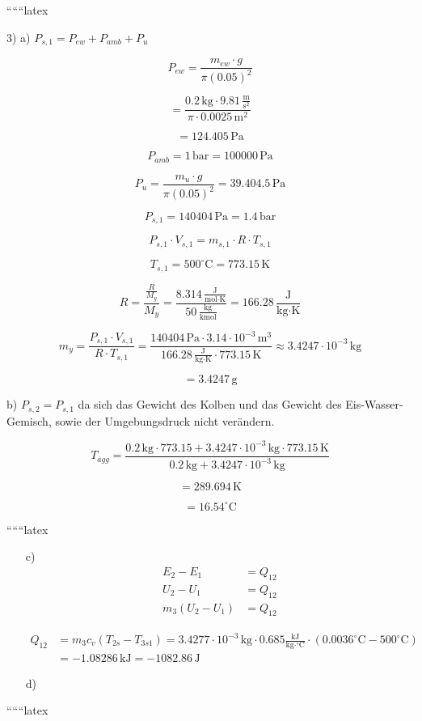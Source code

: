 
``````latex


3) a) \( P_{s,1} = P_{ew} + P_{amb} + P_u \)

\[
P_{ew} = \frac{m_{ew} \cdot g}{\pi (0.05)^2}
\]

\[
= \frac{0.2 \, \text{kg} \cdot 9.81 \, \frac{\text{m}}{\text{s}^2}}{\pi \cdot 0.0025 \, \text{m}^2}
\]

\[
= 124.405 \, \text{Pa}
\]

\[
P_{amb} = 1 \, \text{bar} = 100000 \, \text{Pa}
\]

\[
P_u = \frac{m_u \cdot g}{\pi (0.05)^2} = 39.404.5 \, \text{Pa}
\]

\[
P_{s,1} = 140404 \, \text{Pa} = 1.4 \, \text{bar}
\]

\[
P_{s,1} \cdot V_{s,1} = m_{s,1} \cdot R \cdot T_{s,1}
\]

\[
T_{s,1} = 500^\circ \text{C} = 773.15 \, \text{K}
\]

\[
R = \frac{\frac{R}{M_y}}{M_y} = \frac{8.314 \, \frac{\text{J}}{\text{mol} \cdot \text{K}}}{50 \, \frac{\text{kg}}{\text{kmol}}} = 166.28 \, \frac{\text{J}}{\text{kg} \cdot \text{K}}
\]

\[
m_y = \frac{P_{s,1} \cdot V_{s,1}}{R \cdot T_{s,1}} = \frac{140404 \, \text{Pa} \cdot 3.14 \cdot 10^{-3} \, \text{m}^3}{166.28 \, \frac{\text{J}}{\text{kg} \cdot \text{K}} \cdot 773.15 \, \text{K}} \approx 3.4247 \cdot 10^{-3} \, \text{kg}
\]

\[
= 3.4247 \, \text{g}
\]

b) \( P_{s,2} = P_{s,1} \) da sich das Gewicht des Kolben und das Gewicht des Eis-Wasser-Gemisch, sowie der Umgebungsdruck nicht verändern.

\[
T_{agg} = \frac{0.2 \, \text{kg} \cdot 773.15 + 3.4247 \cdot 10^{-3} \, \text{kg} \cdot 773.15 \, \text{K}}{0.2 \, \text{kg} + 3.4247 \cdot 10^{-3} \, \text{kg}}
\]

\[
= 289.694 \, \text{K}
\]

\[
= 16.54^\circ \text{C}
\]

``````latex

\begin{itemize}
    \item[c)] 
    \begin{align*}
        E_2 - E_1 &= Q_{12} \\
        U_2 - U_1 &= Q_{12} \\
        m_3 (U_2 - U_1) &= Q_{12}
    \end{align*}
    
    \begin{align*}
        Q_{12} &= m_3 c_v \left( T_{2s} - T_{3s1} \right) = 3.4277 \cdot 10^{-3} \, \text{kg} \cdot 0.685 \frac{\text{kJ}}{\text{kg} \cdot ^\circ \text{C}} \cdot \left( 0.0036^\circ \text{C} - 500^\circ \text{C} \right) \\
        &= -1.08286 \, \text{kJ} = -1082.86 \, \text{J}
    \end{align*}
    
    \item[d)]
\end{itemize}

``````latex


